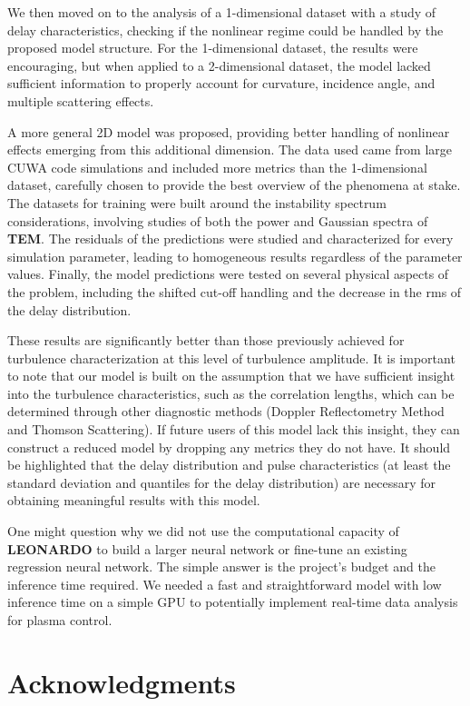 \documentclass[11pt,a4paper,openany]{report}
\begin{document}
\begin{multicols}{2}
    We then moved on to the analysis of a 1-dimensional dataset with a study of delay characteristics, checking if the nonlinear regime could be handled by the proposed model structure. For the 1-dimensional dataset, the results were encouraging, but when applied to a 2-dimensional dataset, the model lacked sufficient information to properly account for curvature, incidence angle, and multiple scattering effects.

    A more general 2D model was proposed, providing better handling of nonlinear effects emerging from this additional dimension. The data used came from large CUWA code simulations and included more metrics than the 1-dimensional dataset, carefully chosen to provide the best overview of the phenomena at stake. The datasets for training were built around the instability spectrum considerations, involving studies of both the power and Gaussian spectra of \textbf{TEM}. The residuals of the predictions were studied and characterized for every simulation parameter, leading to homogeneous results regardless of the parameter values. Finally, the model predictions were tested on several physical aspects of the problem, including the shifted cut-off handling and the decrease in the rms of the delay distribution.

    These results are significantly better than those previously achieved for turbulence characterization at this level of turbulence amplitude. It is important to note that our model is built on the assumption that we have sufficient insight into the turbulence characteristics, such as the correlation lengths, which can be determined through other diagnostic methods (Doppler Reflectometry Method and Thomson Scattering). If future users of this model lack this insight, they can construct a reduced model by dropping any metrics they do not have. It should be highlighted that the delay distribution and pulse characteristics (at least the standard deviation and quantiles for the delay distribution) are necessary for obtaining meaningful results with this model.

    One might question why we did not use the computational capacity of \textbf{LEONARDO} to build a larger neural network or fine-tune an existing regression neural network. The simple answer is the project's budget and the inference time required. We needed a fast and straightforward model with low inference time on a simple GPU to potentially implement real-time data analysis for plasma control.

    \chapter{Acknowledgments}


\end{multicols}
\end{document}
